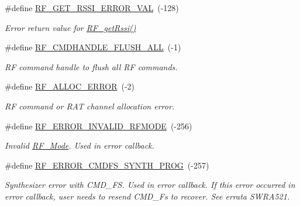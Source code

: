 {\bf }\par
\begin{DoxyCompactItemize}
\item 
\#define \hyperlink{_r_f_8h_a40e933adc8b5b1c03133451361c5505b}{R\+F\+\_\+\+G\+E\+T\+\_\+\+R\+S\+S\+I\+\_\+\+E\+R\+R\+O\+R\+\_\+\+V\+A\+L}~(-\/128)
\begin{DoxyCompactList}\small\item\em Error return value for \hyperlink{_r_f_8h_ac3fe0d39243fb6bbefe0216d958a6779}{R\+F\+\_\+get\+Rssi()} \end{DoxyCompactList}\item 
\#define \hyperlink{_r_f_8h_aacfd2e3e3a2596605cc8b182df438b2f}{R\+F\+\_\+\+C\+M\+D\+H\+A\+N\+D\+L\+E\+\_\+\+F\+L\+U\+S\+H\+\_\+\+A\+L\+L}~(-\/1)
\begin{DoxyCompactList}\small\item\em R\+F command handle to flush all R\+F commands. \end{DoxyCompactList}\item 
\#define \hyperlink{_r_f_8h_ad2e517d9efabde3a1868a274ed0f683b}{R\+F\+\_\+\+A\+L\+L\+O\+C\+\_\+\+E\+R\+R\+O\+R}~(-\/2)
\begin{DoxyCompactList}\small\item\em R\+F command or R\+A\+T channel allocation error. \end{DoxyCompactList}\item 
\#define \hyperlink{_r_f_8h_a86f899115073dc30d7b528cb0e12a9f1}{R\+F\+\_\+\+E\+R\+R\+O\+R\+\_\+\+I\+N\+V\+A\+L\+I\+D\+\_\+\+R\+F\+M\+O\+D\+E}~(-\/256)
\begin{DoxyCompactList}\small\item\em Invalid \hyperlink{struct_r_f___mode}{R\+F\+\_\+\+Mode}. Used in error callback. \end{DoxyCompactList}\item 
\#define \hyperlink{_r_f_8h_a40a0b1b81a2bebefb91b952d750634dc}{R\+F\+\_\+\+E\+R\+R\+O\+R\+\_\+\+C\+M\+D\+F\+S\+\_\+\+S\+Y\+N\+T\+H\+\_\+\+P\+R\+O\+G}~(-\/257)
\begin{DoxyCompactList}\small\item\em Synthesizer error with C\+M\+D\+\_\+\+F\+S. Used in error callback. If this error occurred in error callback, user needs to resend C\+M\+D\+\_\+\+Fs to recover. See errata S\+W\+R\+A521. \end{DoxyCompactList}\end{DoxyCompactItemize}

